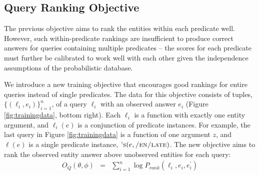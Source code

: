 \documentclass[11pt]{article}
\newcommand{\pred}[1]{\textsc{#1}}
\begin{document}
\subsection{Query Ranking Objective}
\label{sec:qro}

The previous objective aims to rank the entities within each predicate
well. However, such within-predicate rankings are insufficient to
produce correct answers for queries containing multiple predicates --
the scores for each predicate must further be calibrated to work well
with each other given the independence assumptions of the
probabilistic database.

We introduce a new training objective that encourages good rankings
for entire queries instead of single predicates. The data for this
objective consists of tuples, $\{(\ell_i, e_i)\}_{i=1}^n$, of a query
$\ell_i$ with an observed answer $e_i$ (Figure \ref{fig:trainingdata},
bottom right). Each $\ell_i$ is a function with exactly one entity
argument, and $\ell_i(e)$ is a conjunction of predicate instances. For
example, the last query in Figure \ref{fig:trainingdata} is a function
of one argument $z$, and $\ell(e)$ is a single predicate instance,
$\pred{'s}(e, \pred{/en/late})$. The new objective aims to rank the
observed entity answer above unobserved entities for each query: {
\setlength{\belowdisplayskip}{-10pt}
\begin{eqnarray*}
O_{Q}(\theta, \phi) & = & \sum_{i=1}^n \log P_{rank}(\ell_i, e_i, e_i^\prime)  \\
\end{eqnarray*}
}
% 
\end{document}
